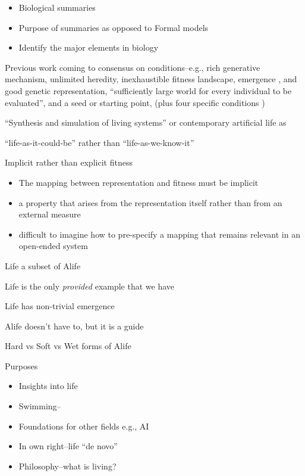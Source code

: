 \autocite{Godfrey-Smith2007}
\begin{itemize}
	\item Biological summaries
	\item Purpose of summaries as opposed to Formal models
	\item Identify the major elements in biology
\end{itemize}

Previous work coming to consensus on conditions--e.g., rich generative mechanism, unlimited heredity, inexhaustible fitness landscape, emergence \autocite{Vasas2015}, and good genetic representation, ``sufficiently large world for every individual to be evaluated'', and a seed or starting point, (plus four specific conditions \autocite{Soros2014})


``Synthesis and simulation of living systems'' or contemporary artificial life as 

``life-as-it-could-be'' rather than ``life-as-we-know-it'' \autocite{Langton1989}

Implicit rather than explicit fitness

\begin{itemize}
	\item
	      The mapping between representation and fitness must be implicit
	\item
	      a property that arises from the representation itself rather than from
	      an external measure
	\item
	      difficult to imagine how to pre-specify a mapping that remains
	      relevant in an open-ended system
\end{itemize}

Life a subset of Alife

Life is the only \emph{provided} example that we have

Life has non-trivial emergence

Alife doesn't have to, but it is a guide

Hard vs Soft vs Wet forms of Alife

Purposes

\begin{itemize}
	\item
	      Insights into life
	\item
	      Swimming--\autocite{Terzopoulos1994}
	\item
	      Foundations for other fields e.g., AI
	\item
	      In own right--life ``de novo''
	\item
	      Philosophy--what is living?
\end{itemize}

